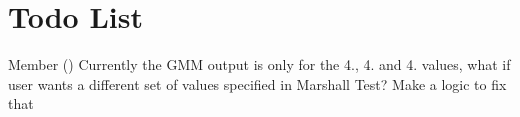 \chapter{Todo List}
\hypertarget{todo}{}\label{todo}

\begin{DoxyRefList}
\item[Member \doxylink{group___h_t_m_l_gen_funcs_gaf9b8272667a9b03cfd908e9a0cc1a7d4}{Main\+Window\+::generate\+\_\+html\+\_\+gmm} ()]\label{todo__todo000001}%
%
Currently the GMM output is only for the 4., 4. and 4. values, what if user wants a different set of values specified in Marshall Test? Make a logic to fix that 
\end{DoxyRefList}